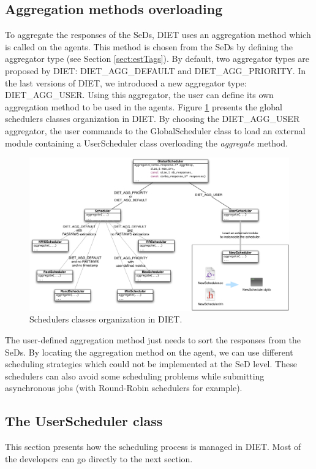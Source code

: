 \subsection{Aggregation methods overloading}
To aggregate the responses of the SeDs, DIET uses an aggregation method
which is called on the agents. This method is chosen from the SeDs
by defining the aggregator type (see Section \ref{sect:estTags}).
By default, two aggregator types are proposed by DIET:
DIET\_AGG\_DEFAULT and DIET\_AGG\_PRIORITY. In the last versions of DIET, we
introduced a new aggregator type: DIET\_AGG\_USER. Using this
aggregator, the user can define its own aggregation method to be used in
the agents. 
Figure \ref{fig:DIETScheduling} presents the global schedulers classes
organization in DIET. By choosing the DIET\_AGG\_USER aggregator, the user
commands to the GlobalScheduler class to load an external module containing
a UserScheduler class overloading the \textit{aggregate} method.
\begin{figure}[h]
  \centering
  \includegraphics[width=16cm]{fig/DIETScheduling}
  \caption{Schedulers classes organization in DIET.\label{fig:DIETScheduling}}
\end{figure}

The user-defined aggregation method just needs to sort the responses from the
SeDs. By locating the aggregation method on the agent, we can use different
scheduling strategies which could not be implemented at the SeD level. These
schedulers can also avoid some scheduling problems while submitting asynchronous
jobs (with Round-Robin schedulers for example).

\subsection{The UserScheduler class}
This section presents how the scheduling process is managed in DIET.
Most of the developers can go directly to the next section.

